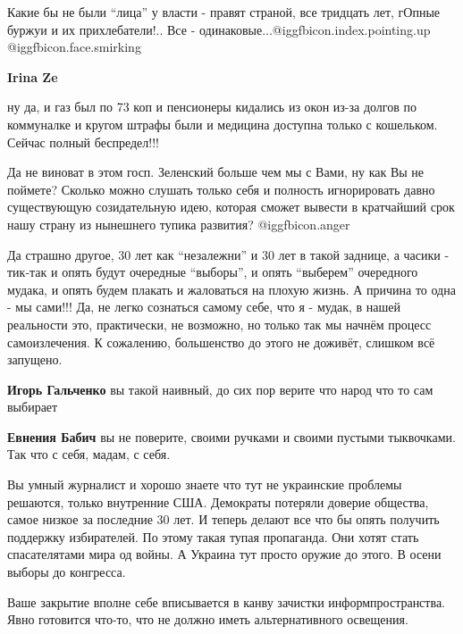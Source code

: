 \begin{itemize}
\begin{itemize}
Какие бы не были \enquote{лица} у власти - правят страной, все тридцать лет, гОпные
буржуи и их прихлебатели!.. Все - одинаковые...@igg{fbicon.index.pointing.up} @igg{fbicon.face.smirking} 


\textbf{Irina Ze} 

ну да, и газ был по 73 коп и пенсионеры кидались из окон из-за долгов по
коммуналке и кругом штрафы были и медицина доступна только с кошельком. Сейчас
полный беспредел!!!

\end{itemize} %


Да не виноват в этом госп. Зеленский больше чем мы с Вами, ну как Вы не
поймете? Сколько можно слушать только себя и полность игнорировать давно
существующую созидательную идею, которая сможет вывести в кратчайший срок нашу
страну из нынешнего тупика развития?  @igg{fbicon.anger} 


Да страшно другое, 30 лет как \enquote{незалежни} и 30 лет в такой заднице, а часики -
тик-так и опять будут очередные \enquote{выборы}, и опять \enquote{выберем} очередного мудака,
и опять будем плакать и жаловаться на плохую жизнь. А причина то одна - мы
сами!!! Да, не легко сознаться самому себе, что я - мудак, в нашей реальности
это, практически, не возможно, но только так мы начнём процесс самоизлечения. К
сожалению, большенство до этого не доживёт, слишком всё запущено.

\begin{itemize} %
\textbf{Игорь Гальченко} вы такой наивный, до сих пор верите что народ что то сам выбирает

\textbf{Евнения Бабич} вы не поверите, своими ручками и своими пустыми тыквочками. Так что с себя, мадам, с себя.
\end{itemize} %


Вы умный журналист и хорошо знаете что тут не украинские проблемы решаются,
только внутренние США. Демократы потеряли доверие общества, самое низкое за
последние 30 лет. И теперь делают все что бы опять получить поддержку
избирателей. По этому такая тупая пропаганда. Они хотят стать спасателятами
мира од войны. А Украина тут просто оружие до этого. В осени выборы до
конгресса.


Ваше закрытие вполне себе вписывается в канву зачистки информпространства. Явно
готовится что-то, что не должно иметь альтернативного освещения.


\end{itemize}
